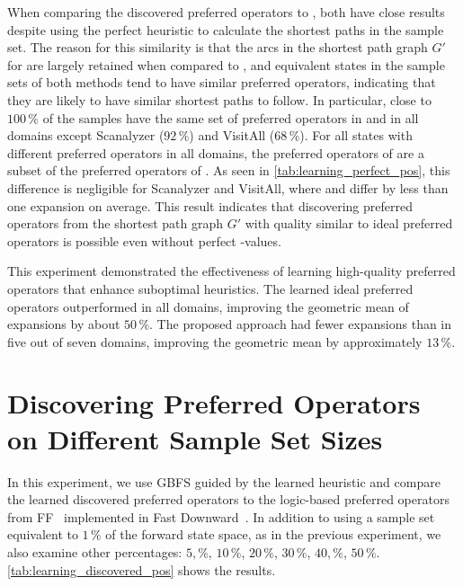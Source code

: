\documentclass[ppgc,diss,english]{iiufrgs}
\begin{document}

When comparing the discovered preferred operators \pogstar to \pog, both have close results despite \pogstar using the perfect heuristic \hstar to calculate the shortest paths in the sample set. The reason for this similarity is that the arcs in the shortest path graph $G'$ for \pog are largely retained when compared to \pogstar, and equivalent states in the sample sets of both methods tend to have similar preferred operators, indicating that they are likely to have similar shortest paths to follow. In particular, close to $100\,\%$ of the samples have the same set of preferred operators in \pogstar and \pog in all domains except Scanalyzer ($92\,\%$) and VisitAll ($68\,\%$). For all states with different preferred operators in all domains, the preferred operators of \pog are a subset of the preferred operators of \pogstar. As seen in \cref{tab:learning_perfect_pos}, this difference is negligible for Scanalyzer and VisitAll, where \pogstar and \pog differ by less than one expansion on average. This result indicates that discovering preferred operators from the shortest path graph $G'$ with quality similar to ideal preferred operators is possible even without perfect \hstar-values.

This experiment demonstrated the effectiveness of learning high-quality preferred operators that enhance suboptimal heuristics. The learned ideal preferred operators \postar outperformed \hnn in all domains, improving the geometric mean of expansions by about $50\,\%$. The proposed approach \pog had fewer expansions than \hnn in five out of seven domains, improving the geometric mean by approximately $13\,\%$.


\section{Discovering Preferred Operators on Different Sample Set Sizes}
\label{sec:exp-performance-po}
In this experiment, we use GBFS guided by the learned heuristic \hnn and compare the learned discovered preferred operators \pog to the logic-based preferred operators \poff from FF~\cite{Hoffmann.Nebel/2001} implemented in Fast Downward~\cite{Helmert/2006}. In addition to using a sample set equivalent to $1\,\%$ of the forward state space, as in the previous experiment, we also examine other percentages: $5,\%$, $10\,\%$, $20\,\%$, $30\,\%$, $40,\%$, $50\,\%$. \cref{tab:learning_discovered_pos} shows the results.
\end{document}
